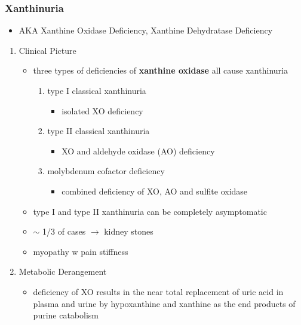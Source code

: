 \documentclass[12pt]{scrartcl}
\begin{document}
\subsubsection{Xanthinuria}
\label{sec:org7b92f69}
\begin{itemize}
\item AKA Xanthine Oxidase Deficiency, Xanthine Dehydratase Deficiency
\end{itemize}
\begin{enumerate}
\item Clinical Picture
\label{sec:org90a522b}
\begin{itemize}
\item three types of deficiencies of \textbf{xanthine oxidase} all cause
xanthinuria
\begin{enumerate}
\item type I classical xanthinuria
\begin{itemize}
\item isolated XO deficiency
\end{itemize}
\item type II classical xanthinuria
\begin{itemize}
\item XO and aldehyde oxidase (AO) deficiency
\end{itemize}
\item molybdenum cofactor deficiency
\begin{itemize}
\item combined deficiency of XO, AO and sulfite oxidase
\end{itemize}
\end{enumerate}
\item type I and type II xanthinuria can be completely asymptomatic
\item \(\sim\) 1/3 of cases \(\to\) kidney stones
\item myopathy w pain stiffness
\end{itemize}

\item Metabolic Derangement
\label{sec:org6b4e66a}
\begin{itemize}
\item deficiency of XO results in the near total replacement of uric acid
in plasma and urine by hypoxanthine and xanthine as the end products
of purine catabolism
\end{itemize}




\end{enumerate}
\end{document}
